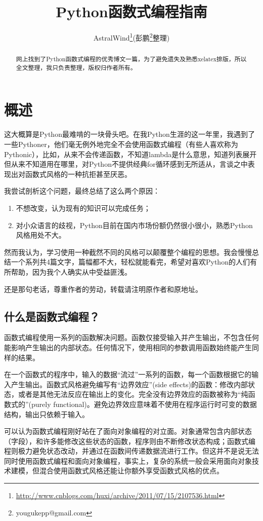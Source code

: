 \documentclass[12pt,a4paper]{report}
\title{Python函数式编程指南}
\author{AstralWind\footnote{\url{http://www.cnblogs.com/huxi/archive/2011/07/15/2107536.html}}(彭鹏\footnote{yougukepp@gmail.com}整理)}
\begin{document}
\maketitle
\tableofcontents

\begin{abstract}
网上找到了Python函数式编程的优秀博文一篇，为了避免遗失及熟悉xelatex排版，所以全文整理，我只负责整理，版权归作者所有。
\end{abstract}

\chapter{概述}
这大概算是Python最难啃的一块骨头吧。在我Python生涯的这一年里，我遇到了一些Pythoner，他们毫无例外地完全不会使用函数式编程（有些人喜欢称为Pythonic），比如，从来不会传递函数，不知道lambda是什么意思，知道列表展开但从来不知道用在哪里，对Python不提供经典for循环感到无所适从，言谈之中表现出对函数式风格的一种抗拒甚至厌恶。 

我尝试剖析这个问题，最终总结了这么两个原因：
\begin{enumerate}
    \item 不想改变，认为现有的知识可以完成任务；
    \item 对小众语言的歧视，Python目前在国内市场份额仍然很小很小，熟悉Python风格用处不大。 
\end{enumerate}

然而我认为，学习使用一种截然不同的风格可以颠覆整个编程的思想。我会慢慢总结一个系列共4篇文字，篇幅都不大，轻松就能看完，希望对喜欢Python的人们有所帮助，因为我个人确实从中受益匪浅。 

还是那句老话，尊重作者的劳动，转载请注明原作者和原地址。
\section{什么是函数式编程？} 
函数式编程使用一系列的函数解决问题。函数仅接受输入并产生输出，不包含任何能影响产生输出的内部状态。任何情况下，使用相同的参数调用函数始终能产生同样的结果。

在一个函数式的程序中，输入的数据“流过”一系列的函数，每一个函数根据它的输入产生输出。函数式风格避免编写有“边界效应”(side effects)的函数：修改内部状态，或者是其他无法反应在输出上的变化。完全没有边界效应的函数被称为“纯函数式的”(purely functional)。避免边界效应意味着不使用在程序运行时可变的数据结构，输出只依赖于输入。

可以认为函数式编程刚好站在了面向对象编程的对立面。对象通常包含内部状态（字段），和许多能修改这些状态的函数，程序则由不断修改状态构成；函数式编程则极力避免状态改动，并通过在函数间传递数据流进行工作。但这并不是说无法同时使用函数式编程和面向对象编程，事实上，复杂的系统一般会采用面向对象技术建模，但混合使用函数式风格还能让你额外享受函数式风格的优点。
\end{document}
